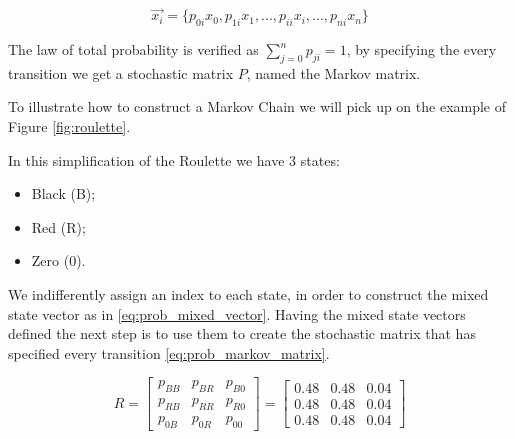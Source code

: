 \begin{equation}
\label{eq:prob_mixed_vector}
\overrightarrow{x_{i}}  = \{ p_{0i}x_{0} , p_{1i}x_{1}, ... ,  p_{ii}x_{i}, ..., p_{ni}x_{n} \}
\end{equation}


The law of total probability is verified as $\sum_{j=0}^{n}p_{ji}=1$, by specifying the every transition we get a stochastic matrix $P$, named the Markov matrix.

To illustrate how to construct a Markov Chain we will pick up on the example of Figure \ref{fig:roulette}. 

In this simplification of the Roulette we have $3$ states:
\begin{itemize}
\item Black (B);
\item Red (R);
\item Zero (0).
\end{itemize}

We indifferently assign an index to each state, in order to construct the mixed state vector as in \ref{eq:prob_mixed_vector}. Having the mixed state vectors defined the next step is to use them to create the stochastic matrix that has specified every transition \ref{eq:prob_markov_matrix}.

\begin{equation}
\label{eq:prob_markov_matrix}
R=\left[\begin{array}{ccc}
p_{BB} & p_{BR} & p_{B0}\\
p_{RB} & p_{RR} & p_{R0}\\
p_{0B} & p_{0R} & p_{00}
\end{array}\right] = \left[\begin{array}{ccc}
0.48 & 0.48 & 0.04\\
0.48 & 0.48 & 0.04\\
0.48 & 0.48 & 0.04
\end{array}\right]
\end{equation}










